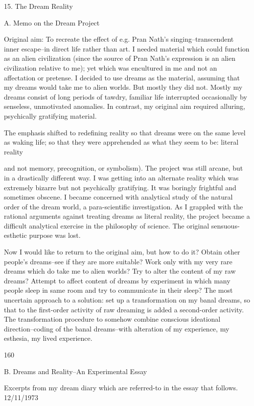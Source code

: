 \documentclass[10pt,twoside]{memoir}
\begin{document}
\begin{enumerate}
{{{{{{{{{{{{{{{{{{{{15. The Dream Reality 


A. Memo on the Dream Project 


Original aim: To recreate the effect of e.g. Pran Nath's singing--transcendent 
inner escape--in direct life rather than art. I needed material which could 
function as an alien civilization (since the source of Pran Nath's expression is 
an alien civilization relative to me); yet which was encultured in me and not 
an affectation or pretense. I decided to use dreams as the material, assuming 
that my dreams would take me to alien worlds. But mostly they did not. 
Mostly my dreams consist of long periods of tawdry, familiar life interrupted 
occasionally by senseless, unmotivated anomalies. In contrast, my original 
aim required alluring, psychically gratifying material. 


The emphasis shifted to redefining reality so that dreams were on the same 
level as waking life; so that they were apprehended as what they seem to be: 
literal reality {and not memory, precognition, or symbolism). The project 
was still arcane, but in a drastically different way. I was getting into an 
alternate reality which was extremely bizarre but not psychically gratifying. 
It was boringly frightful and sometimes obscene. I became concerned with 
analytical study of the natural order of the dream world, a para-scientific 
investigation. As I grappled with the rational arguments against treating 
dreams as literal reality, the project became a difficult analytical exercise in 
the philosophy of science. The original sensuous-esthetic purpose was lost. 


Now I would like to return to the original aim, but how to do it? Obtain 
other people's dreams--see if they are more suitable? Work only with my 
very rare dreams which do take me to alien worlds? Try to alter the content 
of my raw dreams? Attempt to affect content of dreams by experiment in 
which many people sleep in same room and try to communicate in their 
sleep? The most uncertain approach to a solution: set up a transformation 
on my banal dreams, so that to the first-order activity of raw dreaming is 
added a second-order activity. The transformation procedure to somehow 
combine conscious ideational direction--coding of the banal dreams--with 
alteration of my experience, my esthesia, my lived experience. 


160 


B. Dreams and Reality--An Experimental Essay 


Excerpts from my dream diary which are referred-to in the essay that 
follows. 
12/11/1973 

}}}}}}}}}}}}}}}}}}}}}
\end{enumerate}
\end{document}

